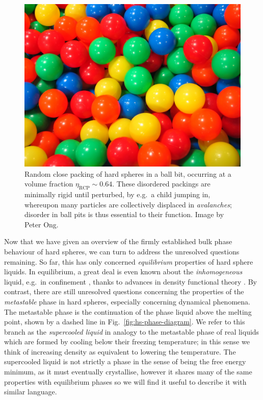 \documentclass[11pt,twoside]{report}
\begin{document}
\begin{figure}
  \includegraphics[width=0.75\linewidth,outer]{ball-pit-horizontal}
  \caption[Random close packing in a ball pit]{
    Random close packing of hard spheres in a ball bit, occurring at a volume fraction $\eta_\mathrm{RCP} \sim 0.64$.
    These disordered packings are minimally rigid until perturbed, by e.g.\ a child jumping in, whereupon many particles are collectively displaced in \emph{avalanches}; disorder in ball pits is thus essential to their function.
    Image by Peter Ong.}
  \label{fig:rcp}
\end{figure}

Now that we have given an overview of the firmly established bulk phase behaviour of hard spheres, we can turn to address the unresolved questions remaining.
So far, this has only concerned \emph{equilibrium} properties of hard sphere liquids.
In equilibrium, a great deal is even known about the \emph{inhomogeneous} liquid, e.g.\ in confinement \cite{GonzalezJCP1998}, thanks to advances in density functional theory \cite{RosenfeldPRL1989,RothJPCM2010}.
By contrast, there are still unresolved questions concerning the properties of the \emph{metastable} phase in hard spheres, especially concerning dynamical phenomena.
The metastable phase is the continuation of the phase liquid above the melting point, shown by a dashed line in Fig.\ \ref{fig:hs-phase-diagram}.
We refer to this branch as the \emph{supercooled liquid} in analogy to the metastable phase of real liquids which are formed by cooling below their freezing temperature; in this sense we think of increasing density as equivalent to lowering the temperature.
The supercooled liquid is not strictly a phase in the sense of being the free energy minimum, as it must eventually crystallise, however it shares many of the same properties with equilibrium phases%
so we will find it useful to describe it with similar language.
\end{document}
